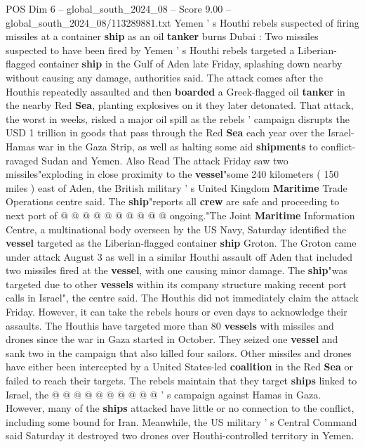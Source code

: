 \begin{textsample}{POS Dim 6 – global\_south\_2024\_08 – Score 9.00 – global\_south\_2024\_08/113289881.txt}  \label{ex:f6_pos_321}
Yemen ' s Houthi rebels suspected of firing missiles at a container \textbf{ship} as an oil \textbf{tanker} burns Dubai : Two missiles suspected to have been fired by Yemen ' s Houthi rebels targeted a Liberian-flagged container \textbf{ship} in the Gulf of Aden late Friday, splashing down nearby without causing any damage, authorities said.
The attack comes after the Houthis repeatedly assaulted and then \textbf{boarded} a Greek-flagged oil \textbf{tanker} in the nearby Red \textbf{Sea}, planting explosives on it they later detonated.
That attack, the worst in weeks, risked a major oil spill as the rebels ' campaign disrupts the USD 1 trillion in goods that pass through the Red \textbf{Sea} each year over the Israel-Hamas war in the Gaza Strip, as well as halting some aid \textbf{shipments} to conflict-ravaged Sudan and Yemen.
Also Read The attack Friday saw two missiles"exploding in close proximity to the \textbf{vessel}"some 240 kilometers ( 150 miles ) east of Aden, the British military ' s United Kingdom \textbf{Maritime} Trade Operations centre said.
The \textbf{ship}"reports all \textbf{crew} are safe and proceeding to next port of @ @ @ @ @ @ @ @ @ @ ongoing."The Joint \textbf{Maritime} Information Centre, a multinational body overseen by the US Navy, Saturday identified the \textbf{vessel} targeted as the Liberian-flagged container \textbf{ship} Groton.
The Groton came under attack August 3 as well in a similar Houthi assault off Aden that included two missiles fired at the \textbf{vessel}, with one causing minor damage.
The \textbf{ship}"was targeted due to other \textbf{vessels} within its company structure making recent port calls in Israel", the centre said.
The Houthis did not immediately claim the attack Friday.
However, it can take the rebels hours or even days to acknowledge their assaults.
The Houthis have targeted more than 80 \textbf{vessels} with missiles and drones since the war in Gaza started in October.
They seized one \textbf{vessel} and sank two in the campaign that also killed four sailors.
Other missiles and drones have either been intercepted by a United States-led \textbf{coalition} in the Red \textbf{Sea} or failed to reach their targets.
The rebels maintain that they target \textbf{ships} linked to Israel, the @ @ @ @ @ @ @ @ @ @ ' s campaign against Hamas in Gaza.
However, many of the \textbf{ships} attacked have little or no connection to the conflict, including some bound for Iran.
Meanwhile, the US military ' s Central Command said Saturday it destroyed two drones over Houthi-controlled territory in Yemen.

\end{textsample}
